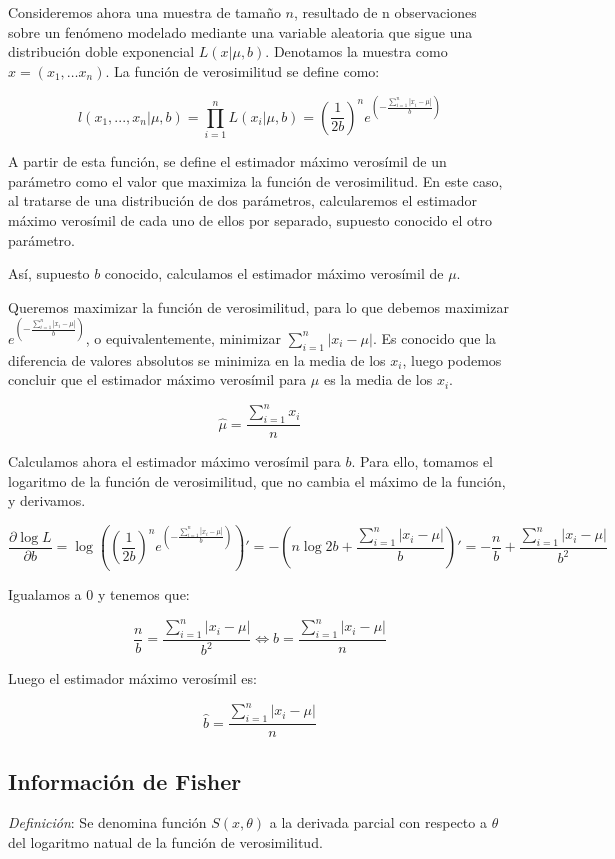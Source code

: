 \documentclass[a4paper, 10pt]{article} %
\begin{document}
Consideremos ahora una muestra de tamaño $n$, resultado de n observaciones sobre un fenómeno modelado
mediante una variable aleatoria que sigue una distribución doble exponencial $L(x|\mu, b)$. Denotamos
la muestra como $x = \left(x_1, \dots x_n\right)$. La función de verosimilitud se define como:

$$l(x_1,...,x_n|\mu, b)=\prod_{i=1}^{n} L(x_i|\mu, b) = \left(\frac{1}{2b}\right)^n 
e^{\left(-\frac{\sum_{i=1}^{n}|x_i-\mu|}{b}\right)}$$

A partir de esta función, se define el estimador máximo verosímil de un parámetro como el valor que
maximiza la función de verosimilitud. En este caso, al tratarse de una distribución de dos parámetros,
calcularemos el estimador máximo verosímil de cada uno de ellos por separado, supuesto conocido el otro parámetro. 

Así, supuesto $b$ conocido, calculamos el estimador máximo verosímil de $\mu$. 

Queremos maximizar la función de verosimilitud, para lo que debemos maximizar $e^{\left(-\frac{\sum_{i=1}^{n}|x_i-\mu|}{b}\right)}$,
o equivalentemente, minimizar $\sum_{i=1}^{n}|x_i-\mu|$. Es conocido que la diferencia de valores absolutos se minimiza
en la media de los $x_i$, luego podemos concluir que el estimador máximo verosímil para $\mu$ es la media de los $x_i$. 

$$\hat{\mu} = \frac{\sum_{i=1}^{n}x_i}{n}$$


Calculamos ahora el estimador máximo verosímil para $b$. Para ello, tomamos el logaritmo de la función de verosimilitud,
que no cambia el máximo de la función, y derivamos. 

$$\frac{\partial \log L}{\partial b} = \log \left(\left(\frac{1}{2b}\right)^n 
e^{\left(-\frac{\sum_{i=1}^{n}|x_i-\mu|}{b}\right)}\right)' = -\left(n\log 2b + \frac{\sum_{i=1}^{n}|x_i - \mu|}{b}\right)' = 
-\frac{n}{b} + \frac{\sum_{i=1}^{n}|x_i - \mu|}{b^2}$$

Igualamos a 0 y tenemos que: 

$$\frac{n}{b} = \frac{\sum_{i=1}^{n}|x_i - \mu|}{b^2} \iff b = \frac{\sum_{i=1}^{n}|x_i - \mu|}{n}$$

Luego el estimador máximo verosímil es: 

$$\hat{b} = \frac{\sum_{i=1}^{n}|x_i - \mu|}{n}$$

\subsection{Información de Fisher}
\emph{Definición}: Se denomina función $S(x,\theta)$ a la derivada parcial con respecto a $\theta$ del
logaritmo natual de la función de verosimilitud.
\end{document}
